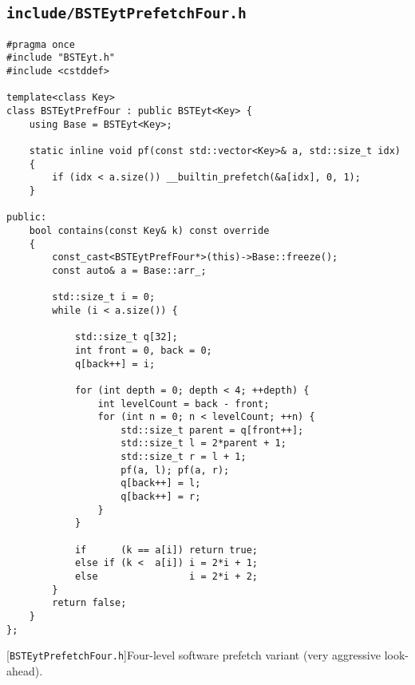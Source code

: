 \subsection{\texttt{include/BSTEytPrefetchFour.h}}
\label{secsec:bsteyt-pref-four-h}
\begin{lstlisting}
#pragma once
#include "BSTEyt.h"
#include <cstddef>

template<class Key>
class BSTEytPrefFour : public BSTEyt<Key> {
    using Base = BSTEyt<Key>;

    static inline void pf(const std::vector<Key>& a, std::size_t idx)
    {
        if (idx < a.size()) __builtin_prefetch(&a[idx], 0, 1);
    }

public:
    bool contains(const Key& k) const override
    {
        const_cast<BSTEytPrefFour*>(this)->Base::freeze();
        const auto& a = Base::arr_;

        std::size_t i = 0;
        while (i < a.size()) {

            std::size_t q[32];           
            int front = 0, back = 0;
            q[back++] = i;

            for (int depth = 0; depth < 4; ++depth) {
                int levelCount = back - front;
                for (int n = 0; n < levelCount; ++n) {
                    std::size_t parent = q[front++];
                    std::size_t l = 2*parent + 1;
                    std::size_t r = l + 1;
                    pf(a, l); pf(a, r);
                    q[back++] = l;
                    q[back++] = r;
                }
            }

            if      (k == a[i]) return true;
            else if (k <  a[i]) i = 2*i + 1;
            else                i = 2*i + 2;
        }
        return false;
    }
};
\end{lstlisting}
[\texttt{BSTEytPrefetchFour.h}]{Four-level software
prefetch variant (very aggressive look-ahead).}
\label{lst:bsteyt-pref-four-h}


